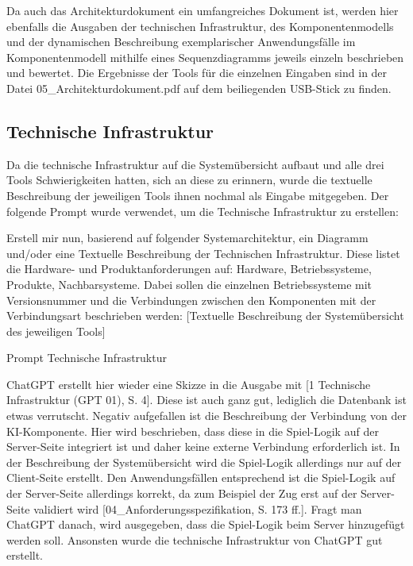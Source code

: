 Da auch das Architekturdokument ein umfangreiches Dokument ist, werden hier ebenfalls die Ausgaben der technischen Infrastruktur, des 
Komponentenmodells und der dynamischen Beschreibung exemplarischer Anwendungsfälle im Komponentenmodell mithilfe eines Sequenzdiagramms 
jeweils einzeln beschrieben und bewertet. Die Ergebnisse der Tools für die einzelnen Eingaben sind in der Datei 05\_Architekturdokument.pdf 
auf dem beiliegenden USB-Stick zu finden.

\subsection*{Technische Infrastruktur}

Da die technische Infrastruktur auf die Systemübersicht aufbaut und alle drei Tools Schwierigkeiten hatten, sich an diese zu erinnern, wurde 
die textuelle Beschreibung der jeweiligen Tools ihnen nochmal als Eingabe mitgegeben. Der folgende Prompt wurde verwendet, um die Technische 
Infrastruktur zu erstellen:

\begin{prompt}[H]
    \begin{tcolorbox}[colback=gray!20, colframe=gray!20, boxrule=0pt, sharp corners] 
        Erstell mir nun, basierend auf folgender Systemarchitektur, ein Diagramm und/oder eine Textuelle Beschreibung der Technischen Infrastruktur. 
        Diese listet die Hardware- und Produktanforderungen auf: Hardware, Betriebssysteme, Produkte, Nachbarsysteme. Dabei sollen die einzelnen 
        Betriebssysteme mit Versionsnummer und die Verbindungen zwischen den Komponenten mit der Verbindungsart beschrieben werden: [Textuelle 
        Beschreibung der Systemübersicht des jeweiligen Tools]
        \vfill
    \end{tcolorbox}
    \caption{Prompt Technische Infrastruktur}
    \label{Prompt Technische Infrastruktur}
\end{prompt}

\clearpage

ChatGPT erstellt hier wieder eine Skizze in die Ausgabe mit [1 Technische Infrastruktur (GPT 01), S. 4]. Diese ist auch ganz gut, lediglich die Datenbank ist etwas verrutscht. Negativ aufgefallen 
ist die Beschreibung der Verbindung von der KI-Komponente. Hier wird beschrieben, dass diese in die Spiel-Logik auf der Server-Seite integriert ist und 
daher keine externe Verbindung erforderlich ist. In der Beschreibung der Systemübersicht wird die Spiel-Logik allerdings nur auf der Client-Seite erstellt. 
Den Anwendungsfällen entsprechend ist die Spiel-Logik auf der Server-Seite allerdings korrekt, da zum Beispiel der Zug erst auf der Server-Seite validiert 
wird [04\_Anforderungsspezifikation, S. 173 ff.]. Fragt man ChatGPT danach, wird ausgegeben, dass die Spiel-Logik beim Server hinzugefügt werden soll. Ansonsten wurde die 
technische Infrastruktur von ChatGPT gut erstellt.

